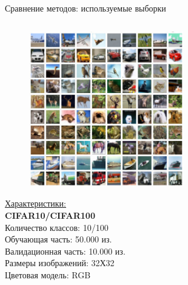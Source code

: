 \documentclass[10pt]{beamer}
\begin{document}
\begin{frame}{Сравнение методов: используемые выборки}
\begin{columns}
            \begin{column}{0.5\textwidth}
                \begin{figure}[H]
                    \centering
                    \includegraphics[width=0.6\textwidth]{pic3-2.pdf}
                \end{figure}
                \underline{Характеристики:}\\
                \textbf{CIFAR10/CIFAR100}\\
                Количество классов: 10/100\\
                Обучающая часть: 50.000 из.\\
                Валидационная часть: 10.000 из.\\
                Размеры изображений: 32Х32\\
                Цветовая модель: RGB
            \end{column}
        \end{columns}
        \end{frame}
\end{document}
